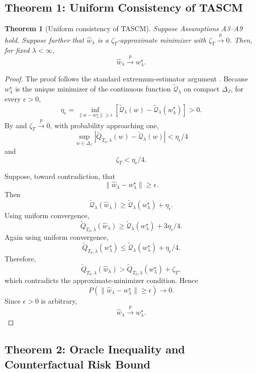 \documentclass[11pt]{article}
\theoremstyle{plain}
\newtheorem{theorem}{Theorem}[section]
\theoremstyle{definition}
\theoremstyle{remark}
\newcommand{\1}{\mathbbm{1}}
\newcommand{\pto}{\xrightarrow{p}}
\begin{document}
\subsection{Theorem 1: Uniform Consistency of TASCM}

\begin{theorem}[Uniform consistency of TASCM]
\label{thm:consistency}
Suppose Assumptions A3--A9 hold. Suppose further that
\(\widehat w_\lambda\) is a \(\zeta_T\)-approximate minimizer with
\(\zeta_T\pto0\). Then, for fixed \(\lambda<\infty\),
\[
\widehat w_\lambda
\pto
w_\lambda^\star.
\]
\end{theorem}

\begin{proof}
The proof follows the standard extremum-estimator argument
\citep{newey1994large,vaart1998asymptotic}. Because \(w_\lambda^\star\) is the
unique minimizer of the continuous function \(\widetilde{\mathcal Q}_{\lambda}\)
on compact \(\Delta_J\), for every \(\epsilon>0\),
\[
\eta_\epsilon
=
\inf_{\|w-w_\lambda^\star\|\ge\epsilon}
\left[
\widetilde{\mathcal Q}_{\lambda}(w)
-
\widetilde{\mathcal Q}_{\lambda}(w_\lambda^\star)
\right]
>0.
\]
By  and \(\zeta_T\pto0\), with probability
approaching one,
\[
\sup_{w\in\Delta_J}
\left|
\widetilde Q_{T_0,\lambda}(w)
-
\widetilde{\mathcal Q}_{\lambda}(w)
\right|
<
\eta_\epsilon/4
\]
and
\[
\zeta_T<\eta_\epsilon/4.
\]

Suppose, toward contradiction, that
\[
\|\widehat w_\lambda-w_\lambda^\star\|\ge \epsilon.
\]
Then
\[
\widetilde{\mathcal Q}_{\lambda}(\widehat w_\lambda)
\ge
\widetilde{\mathcal Q}_{\lambda}(w_\lambda^\star)
+
\eta_\epsilon.
\]
Using uniform convergence,
\[
\widetilde Q_{T_0,\lambda}(\widehat w_\lambda)
\ge
\widetilde{\mathcal Q}_{\lambda}(w_\lambda^\star)
+
3\eta_\epsilon/4.
\]
Again using uniform convergence,
\[
\widetilde Q_{T_0,\lambda}(w_\lambda^\star)
\le
\widetilde{\mathcal Q}_{\lambda}(w_\lambda^\star)
+
\eta_\epsilon/4.
\]
Therefore,
\[
\widetilde Q_{T_0,\lambda}(\widehat w_\lambda)
>
\widetilde Q_{T_0,\lambda}(w_\lambda^\star)
+
\zeta_T,
\]
which contradicts the approximate-minimizer condition. Hence
\[
P(\|\widehat w_\lambda-w_\lambda^\star\|\ge \epsilon)\to0.
\]
Since \(\epsilon>0\) is arbitrary,
\[
\widehat w_\lambda\pto w_\lambda^\star.
\]
\end{proof}

\subsection{Theorem 2: Oracle Inequality and Counterfactual Risk Bound}
\end{document}
